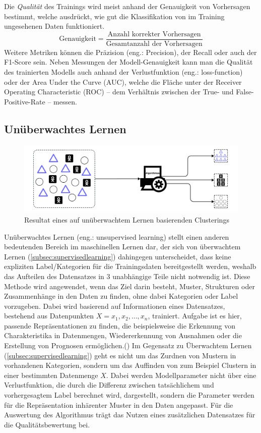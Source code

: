 Die \textit{Qualität} des Trainings wird meist anhand der Genauigkeit von Vorhersagen bestimmt, welche ausdrückt, wie gut die Klassifikation von im Training ungesehenen Daten funktioniert.
\[
\text{Genauigkeit} = \frac{\text{Anzahl korrekter Vorhersagen}}{\text{Gesamtanzahl der Vorhersagen}}
\]
 Weitere Metriken können die Präzision (eng.: Precision), der Recall oder auch der F1-Score sein. Neben Messungen der Modell-Genauigkeit kann man die Qualität des trainierten Modells auch anhand der Verlustfunktion (eng.: loss-function) oder der \glqq Area Under the Curve\grqq{} (AUC), welche die Fläche unter der \glqq Receiver Operating Characteristic\grqq{} (ROC) -- dem Verhältnis zwischen der True- und False-Positive-Rate -- messen.
\subsection{Unüberwachtes Lernen}\label{subsec:unsupervisedlearning}
\begin{figure}[H]
	\centering
	\includegraphics[width=0.8\linewidth]{Bilder/unsupervised_sample.png}
	\caption{Resultat eines auf unüberwachtem Lernen basierenden Clusterings}
\end{figure}
Unüberwachtes Lernen (eng.: unsupervised learning) stellt einen anderen bedeutenden Bereich im maschinellen Lernen dar, der sich von überwachtem Lernen (\ref{subsec:supervisedlearning}) dahingegen unterscheidet, dass keine expliziten Label/Kategorien für die Trainingsdaten bereitgestellt werden, weshalb das Aufteilen des Datensatzes in 3 unabhängige Teile nicht notwendig ist. Diese Methode wird angewendet, wenn das Ziel darin besteht, Muster, Strukturen oder Zusammenhänge in den Daten zu finden, ohne dabei Kategorien oder Label vorzugeben. Dabei wird basierend auf Informationen eines Datensatzes, bestehend aus Datenpunkten \textit{$X = x_1, x_2, \ldots, x_n$}, trainiert. \glqq Aufgabe ist es hier, passende Repräsentationen zu finden, die beispielsweise die Erkennung von Charakteristika in Datenmengen, Wiedererkennung von Ausnahmen oder die Erstellung von Prognosen ermöglichen.\grqq (\cite[5]{lorenz_reinforcement_2020}) Im Gegensatz zu Überwachtem Lernen (\ref{subsec:supervisedlearning}) geht es nicht um das Zurdnen von Mustern in vorhandenen Kategorien, sondern um das Auffinden von zum Beispiel Clustern in einer bestimmten Datenmenge $X$. Dabei werden Modellparameter nicht über eine Verlustfunktion, die durch die Differenz zwischen tatsächlichem und vorhergesagtem Label berechnet wird, dargestellt, sondern die Parameter werden für die Repräsentation inhärenter Muster in den Daten angepasst. Für die Auswertung des Algorithmus trägt das Nutzen eines zusätzlichen Datensatzes für die Qualitätsbewertung bei.
